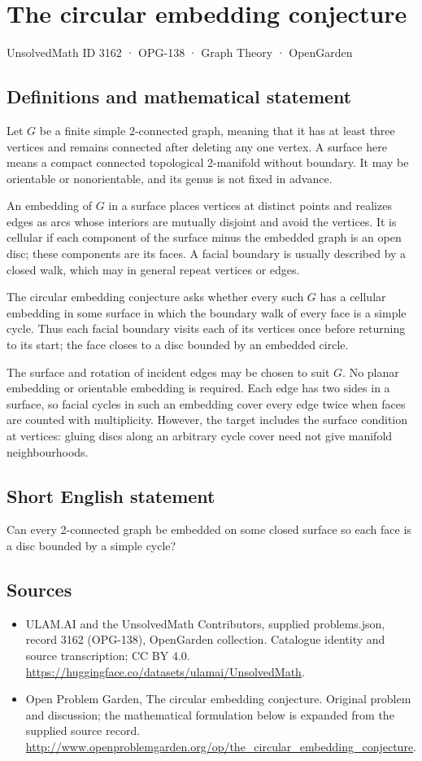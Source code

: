 \documentclass[11pt,a4paper]{article}
\begin{document}
\section*{The circular embedding conjecture}\label{3162}
{\small UnsolvedMath ID 3162 · OPG-138 · Graph Theory · OpenGarden}
\subsection{Definitions and mathematical statement}
Let $G$ be a finite simple $2$-connected graph, meaning that
it has at least three vertices and remains connected after
deleting any one vertex. A surface here means a compact
connected topological $2$-manifold without boundary. It may be
orientable or nonorientable, and its genus is not fixed in
advance.

An embedding of $G$ in a surface places vertices at distinct
points and realizes edges as arcs whose interiors are mutually
disjoint and avoid the vertices. It is cellular if each
component of the surface minus the embedded graph is an open
disc; these components are its faces. A facial boundary is
usually described by a closed walk, which may in general
repeat vertices or edges.

The circular embedding conjecture asks whether every such $G$
has a cellular embedding in some surface in which the boundary
walk of every face is a simple cycle. Thus each facial boundary
visits each of its vertices once before returning to its start;
the face closes to a disc bounded by an embedded circle.

The surface and rotation of incident edges may be chosen to
suit $G$. No planar embedding or orientable embedding is
required. Each edge has two sides in a surface, so facial
cycles in such an embedding cover every edge twice when faces
are counted with multiplicity. However, the target includes
the surface condition at vertices: gluing discs along an
arbitrary cycle cover need not give manifold neighbourhoods.
\subsection{Short English statement}
Can every 2-connected graph be embedded on some closed surface so each face is a disc bounded by a simple cycle?
\subsection{Sources}
\begin{itemize}
\item[S1] ULAM.AI and the UnsolvedMath Contributors, supplied problems.json, record 3162 (OPG-138), OpenGarden collection. Catalogue identity and source transcription; CC BY 4.0.
\url{https://huggingface.co/datasets/ulamai/UnsolvedMath}.
\item[S2] Open Problem Garden, The circular embedding conjecture. Original problem and discussion; the mathematical formulation below is expanded from the supplied source record.
\url{http://www.openproblemgarden.org/op/the_circular_embedding_conjecture}.
\end{itemize}
\end{document}
